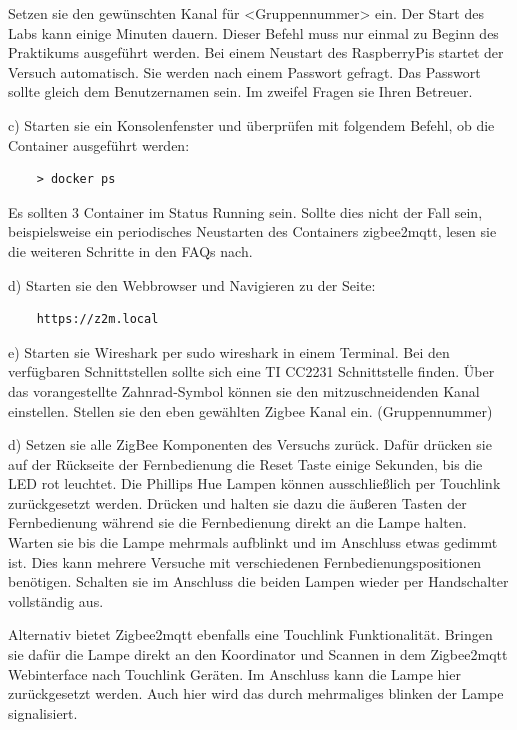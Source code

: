 Setzen sie den gewünschten Kanal für <Gruppennummer> ein. Der Start des Labs kann einige Minuten dauern. Dieser Befehl muss nur einmal zu Beginn
des Praktikums ausgeführt werden. Bei einem Neustart des RaspberryPis startet der Versuch automatisch. Sie werden nach einem Passwort gefragt. 
Das Passwort sollte gleich dem Benutzernamen sein. Im zweifel Fragen sie Ihren Betreuer.

c) Starten sie ein Konsolenfenster und überprüfen mit folgendem Befehl, ob die Container ausgeführt werden:
\begin{lstlisting}
    > docker ps
\end{lstlisting}

Es sollten 3 Container im Status \grqq Running\grqq{} sein. Sollte dies nicht der Fall sein, beispielsweise ein periodisches Neustarten des Containers 
\grqq zigbee2mqtt\grqq{}, lesen sie die weiteren Schritte in den FAQs nach.

d) Starten sie den Webbrowser und Navigieren zu der Seite:
\begin{lstlisting}
    https://z2m.local
\end{lstlisting}

e) Starten sie Wireshark per \grqq sudo wireshark\grqq{} in einem Terminal. Bei den verfügbaren Schnittstellen sollte sich eine 
\grqq TI CC2231\grqq{} Schnittstelle finden. Über das vorangestellte Zahnrad-Symbol können sie den mitzuschneidenden
 Kanal einstellen. Stellen sie den eben gewählten Zigbee Kanal ein. (Gruppennummer)

d) Setzen sie alle ZigBee Komponenten des Versuchs zurück. Dafür drücken sie auf der Rückseite der Fernbedienung die Reset Taste einige Sekunden, bis die LED rot leuchtet.
Die Phillips Hue Lampen können ausschließlich per Touchlink zurückgesetzt werden. Drücken und halten sie dazu die äußeren Tasten der Fernbedienung während sie die Fernbedienung
direkt an die Lampe halten. Warten sie bis die Lampe mehrmals aufblinkt und im Anschluss etwas gedimmt ist. Dies kann mehrere Versuche mit verschiedenen Fernbedienungspositionen benötigen. Schalten sie im Anschluss
die beiden Lampen wieder per Handschalter vollständig aus.

Alternativ bietet Zigbee2mqtt ebenfalls eine Touchlink Funktionalität. Bringen sie dafür die Lampe direkt an den Koordinator und Scannen in dem Zigbee2mqtt Webinterface nach 
Touchlink Geräten. Im Anschluss kann die Lampe hier zurückgesetzt werden. Auch hier wird das durch mehrmaliges blinken der Lampe signalisiert.

